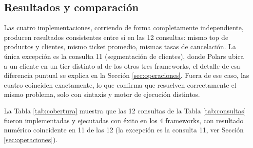 \subsection{Resultados y comparación}

Las cuatro implementaciones, corriendo de forma completamente independiente, producen resultados consistentes entre sí en las 12 consultas: mismo top de productos y clientes, mismo ticket promedio, mismas tasas de cancelación. La única excepción es la consulta 11 (segmentación de clientes), donde Polars ubica a un cliente en un tier distinto al de los otros tres frameworks, el detalle de esa diferencia puntual se explica en la Sección \ref{sec:operaciones}. Fuera de ese caso, las cuatro coinciden exactamente, lo que confirma que resuelven correctamente el mismo problema, solo con sintaxis y motor de ejecución distintos.

La Tabla \ref{tab:cobertura} muestra que las 12 consultas de la Tabla \ref{tab:consultas} fueron implementadas y ejecutadas con éxito en los 4 frameworks, con resultado numérico coincidente en 11 de las 12 (la excepción es la consulta 11, ver Sección \ref{sec:operaciones}).

